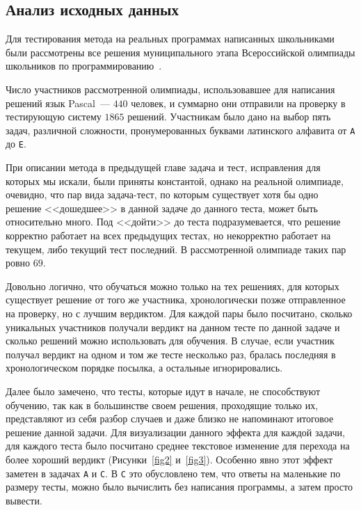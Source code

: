 \subsection{Анализ исходных данных}

Для тестирования метода на реальных программах написанных школьниками были рассмотрены все решения муниципального
этапа Всероссийской олимпиады школьников по программированию~\cite{municipal}.

Число участников рассмотренной олимпиады, использовавшее для написания решений язык Pascal~--- $440$ человек, и суммарно
они отправили на проверку в тестирующую систему $1865$ решений. Участникам было дано на выбор пять задач, различной сложности,
пронумерованных буквами латинского алфавита от \texttt{A} до \texttt{E}.

При описании метода в предыдущей главе задача и тест, исправления для которых мы искали, были приняты константой, однако
на реальной олимпиаде, очевидно, что пар вида задача-тест, по которым существует хотя бы одно решение <<дошедшее>> в данной задаче
до данного теста, может быть относительно много. Под <<дойти>> до теста подразумевается, что решение корректно работает на всех 
предыдущих тестах, но некорректно работает на текущем, либо текущий тест последний. В рассмотренной олимпиаде таких пар ровно
$69$.

Довольно логично, что обучаться можно только на тех решениях, для которых существует решение от того же участника, хронологически
позже отправленное на проверку, но с лучшим вердиктом.
Для каждой пары было посчитано, сколько уникальных участников получали вердикт на данном тесте по данной задаче и сколько решений 
можно использовать для обучения. В случае, если участник получал вердикт на одном и том же тесте несколько раз, бралась
последняя в хронологическом порядке посылка, а остальные игнорировались.

Далее было замечено, что тесты, которые идут в начале, не способствуют обучению, так как в большинстве своем решения, проходящие
только их, представляют из себя разбор случаев и даже близко не напоминают итоговое решение данной задачи. Для визуализации данного эффекта
для каждой задачи, для каждого теста было посчитано среднее текстовое изменение для перехода на более хороший вердикт 
(Рисунки~\ref{fig2} и~\ref{fig3}). Особенно явно этот эффект заметен в задачах \texttt{A} и \texttt{C}. В \texttt{C} это обусловлено
тем, что ответы на маленькие по размеру тесты, можно было вычислить без написания программы, а затем просто вывести.  
 
